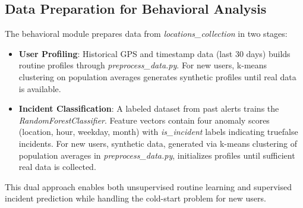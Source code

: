 \documentclass[12pt,a4paper,oneside,english]{book}
\begin{document}
\subsection{Data Preparation for Behavioral Analysis}
\label{sec:Data_behav}
The behavioral module prepares data from \textit{locations\_collection} in two stages:
\begin{itemize}
\item \textbf{User Profiling}: Historical GPS and timestamp data (last 30 days) builds routine profiles through \textit{preprocess\_data.py}. For new users, k-means clustering on population averages generates synthetic profiles until real data is available.
\item \textbf{Incident Classification}: A labeled dataset from past alerts trains the \textit{RandomForestClassifier}. Feature vectors contain four anomaly scores (location, hour, weekday, month) with \textit{is\_incident} labels indicating true\/false incidents. For new users, synthetic data, generated via k-means clustering of population averages in \textit{preprocess\_data.py}, initializes profiles until sufficient real data is collected.
\end{itemize}
This dual approach enables both unsupervised routine learning and supervised incident prediction while handling the cold-start problem for new users.
\end{document}
